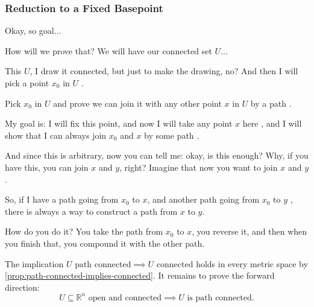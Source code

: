 \begin{proofWrapper}

\subsubsection{Reduction to a Fixed Basepoint}

\begin{speech}[00:51:53 - 00:54:10]
Okay, so goal... 

How will we prove that? We will have our connected set $U$... 

This $U$, I draw it connected, but just to make the drawing, no? And then I will pick a point $x_0$ in $U$ .

Pick $x_0$ in $U$ and prove we can join it with any other point $x$ in $U$ by a path .

My goal is: I will fix this point, and now I will take any point $x$ here , and I will show that I can always join $x_0$ and $x$ by some path .

And since this is arbitrary, now you can tell me: okay, is this enough? Why, if you have this, you can join $x$ and $y$, right? Imagine that now you want to join $x$ and $y$ .

So, if I have a path going from $x_0$ to $x$, and another path going from $x_0$ to $y$ , there is always a way to construct a path from $x$ to $y$.

How do you do it? You take the path from $x_0$ to $x$, you reverse it, and then when you finish that, you compound it with the other path.
\end{speech}

\begin{hidden}
\end{hidden}

\begin{content}
The implication $U \text{ path connected} \implies U \text{ connected}$ holds in every metric space by \cref{prop:path-connected-implies-connected}.
It remains to prove the forward direction:
\[
U \subseteq \mathbb{R}^n \text{ open and connected} \implies U \text{ is path connected}.
\]


\end{content}
\end{proofWrapper}
